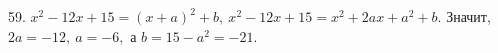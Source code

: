59. $x^2-12x+15=(x+a)^2+b,\ x^2-12x+15=x^2+2ax+a^2+b.$ Значит, $2a=-12,\ a=-6,$ а $b=15-a^2=-21.$\\
